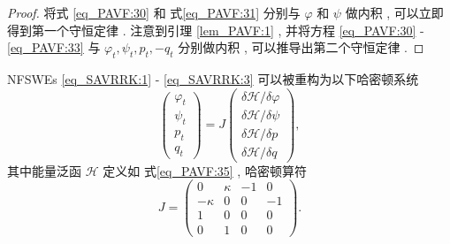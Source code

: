 \begin{proof}
将式 \eqref{eq_PAVF:30} 和 式\eqref{eq_PAVF:31} 分别与 $\varphi$ 和 $\psi$ 做内积 , 可以立即得到第一个守恒定律 . 
注意到引理 \ref{lem_PAVF:1} , 并将方程 \eqref{eq_PAVF:30} - \eqref{eq_PAVF:33} 与 $\varphi_{t} , \psi_{t} , p_{t} , -q_{t}$ 分别做内积 , 可以推导出第二个守恒定律 . 

\end{proof}

\begin{theorem}\label{thm_PAVF:2}
	NFSWEs \eqref{eq_SAVRRK:1} - \eqref{eq_SAVRRK:3} 可以被重构为以下哈密顿系统
\begin{equation}\label{eq_PAVF:37}
	\left(\begin{array}{l}
		\varphi_{t} \\
		\psi_{t} \\
		p_{t} \\
		q_{t}
		\end{array}\right)=J\left(\begin{array}{l}
		\delta \mathcal{H} / \delta \varphi \\
		\delta \mathcal{H} / \delta \psi \\
		\delta \mathcal{H} / \delta p \\
		\delta \mathcal{H} / \delta q
		\end{array}\right) , 
\end{equation}
其中能量泛函 $\mathcal{H}$ 定义如 式\eqref{eq_PAVF:35} , 哈密顿算符
\begin{equation}\label{eq_PAVF:37b}
J=\left(\begin{array}{cccc}
		0 & \kappa & -1 & 0 \\
		-\kappa & 0 & 0 & -1 \\
		1 & 0 & 0 & 0 \\
		0 & 1 & 0 & 0
		\end{array}\right) . 
\end{equation}
\end{theorem}

